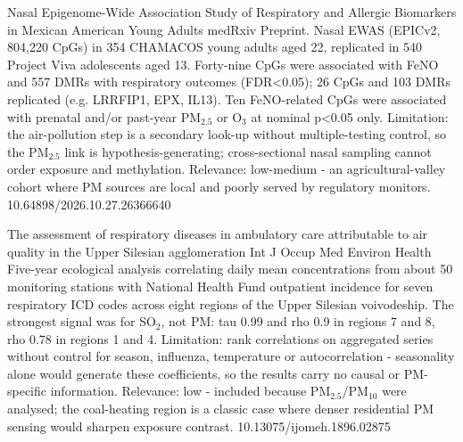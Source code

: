 \documentclass[10pt]{article}
\begin{document}
{Nasal Epigenome-Wide Association Study of Respiratory and Allergic Biomarkers in Mexican American Young Adults}
{medRxiv}
{Preprint. Nasal EWAS (EPICv2, 804,220 CpGs) in 354 CHAMACOS young adults aged 22, replicated in 540 Project Viva adolescents aged 13. Forty-nine CpGs were associated with FeNO and 557 DMRs with respiratory outcomes (FDR<0.05); 26 CpGs and 103 DMRs replicated (e.g. LRRFIP1, EPX, IL13). Ten FeNO-related CpGs were associated with prenatal and/or past-year PM$_{2.5}$ or O$_3$ at nominal p<0.05 only. Limitation: the air-pollution step is a secondary look-up without multiple-testing control, so the PM$_{2.5}$ link is hypothesis-generating; cross-sectional nasal sampling cannot order exposure and methylation. Relevance: low-medium - an agricultural-valley cohort where PM sources are local and poorly served by regulatory monitors.}
{10.64898/2026.10.27.26366640}

{The assessment of respiratory diseases in ambulatory care attributable to air quality in the Upper Silesian agglomeration}
{Int J Occup Med Environ Health}
{Five-year ecological analysis correlating daily mean concentrations from about 50 monitoring stations with National Health Fund outpatient incidence for seven respiratory ICD codes across eight regions of the Upper Silesian voivodeship. The strongest signal was for SO$_2$, not PM: tau 0.99 and rho 0.9 in regions 7 and 8, rho 0.78 in regions 1 and 4. Limitation: rank correlations on aggregated series without control for season, influenza, temperature or autocorrelation - seasonality alone would generate these coefficients, so the results carry no causal or PM-specific information. Relevance: low - included because PM$_{2.5}$/PM$_{10}$ were analysed; the coal-heating region is a classic case where denser residential PM sensing would sharpen exposure contrast.}
{10.13075/ijomeh.1896.02875}

\par{}\baselineskip{}\baselineskip
{}
\end{document}
